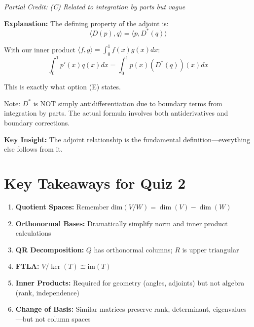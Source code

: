 \documentclass[12pt]{amsart}
\newcommand{\partcred}[1]{{\color{red}\textit{Partial Credit: #1}}}
\newcommand{\hint}{\textbf{Key Insight: }}
\begin{document}
\partcred{(C) Related to integration by parts but vague}

\textbf{Explanation:} 
The defining property of the adjoint is:
$$\langle D(p), q \rangle = \langle p, D^*(q) \rangle$$

With our inner product $\langle f, g \rangle = \int_0^1 f(x)g(x)dx$:
$$\int_0^1 p'(x)q(x)dx = \int_0^1 p(x)(D^*(q))(x)dx$$

This is exactly what option (E) states.

Note: $D^*$ is NOT simply antidifferentiation due to boundary terms from integration by parts. The actual formula involves both antiderivatives and boundary corrections.

\hint The adjoint relationship is the fundamental definition—everything else follows from it.

\hrulefill

\section*{Key Takeaways for Quiz 2}

\begin{enumerate}
\item \textbf{Quotient Spaces:} Remember dim$(V/W) = \dim(V) - \dim(W)$
\item \textbf{Orthonormal Bases:} Dramatically simplify norm and inner product calculations
\item \textbf{QR Decomposition:} $Q$ has orthonormal columns; $R$ is upper triangular
\item \textbf{FTLA:} $V/\ker(T) \cong \text{im}(T)$
\item \textbf{Inner Products:} Required for geometry (angles, adjoints) but not algebra (rank, independence)
\item \textbf{Change of Basis:} Similar matrices preserve rank, determinant, eigenvalues—but not column spaces
\end{enumerate}
\end{document}
